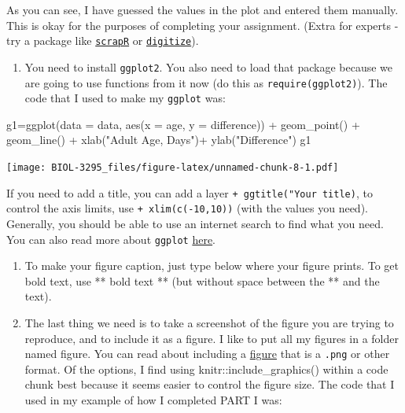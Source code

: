 \documentclass[
]{book}
\newenvironment{Shaded}{\begin{snugshade}}{\end{snugshade}}
\newcommand{\AttributeTok}[1]{\textcolor[rgb]{0.77,0.63,0.00}{#1}}
\newcommand{\FunctionTok}[1]{\textcolor[rgb]{0.00,0.00,0.00}{#1}}
\newcommand{\NormalTok}[1]{#1}
\newcommand{\OtherTok}[1]{\textcolor[rgb]{0.56,0.35,0.01}{#1}}
\newcommand{\SpecialCharTok}[1]{\textcolor[rgb]{0.00,0.00,0.00}{#1}}
\newcommand{\StringTok}[1]{\textcolor[rgb]{0.31,0.60,0.02}{#1}}
\providecommand{\tightlist}{%
  \setlength{\itemsep}{0pt}\setlength{\parskip}{0pt}}
\begin{document}
As you can see, I have guessed the values in the plot and entered them manually. This is okay for the purposes of completing your assignment. (Extra for experts - try a package like \href{https://github.com/adamkucharski/scrapR}{\texttt{scrapR}} or \href{https://github.com/tpoisot/digitize}{\texttt{digitize}}).

\begin{enumerate}
\def\labelenumi{\arabic{enumi}.}
\setcounter{enumi}{5}
\tightlist
\item
  You need to install \texttt{ggplot2}. You also need to load that package because we are going to use functions from it now (do this as \texttt{require(ggplot2)}). The code that I used to make my \texttt{ggplot} was:
\end{enumerate}

\begin{Shaded}
\begin{Highlighting}[]
\NormalTok{g1}\OtherTok{=}\FunctionTok{ggplot}\NormalTok{(}\AttributeTok{data =}\NormalTok{ data, }\FunctionTok{aes}\NormalTok{(}\AttributeTok{x =}\NormalTok{ age, }\AttributeTok{y =}\NormalTok{ difference)) }\SpecialCharTok{+} 
  \FunctionTok{geom\_point}\NormalTok{() }\SpecialCharTok{+}
  \FunctionTok{geom\_line}\NormalTok{() }\SpecialCharTok{+}
  \FunctionTok{xlab}\NormalTok{(}\StringTok{"Adult Age, Days"}\NormalTok{)}\SpecialCharTok{+}
  \FunctionTok{ylab}\NormalTok{(}\StringTok{"Difference"}\NormalTok{)}
\NormalTok{g1}
\end{Highlighting}
\end{Shaded}

\texttt{[image: BIOL-3295\_files/figure-latex/unnamed-chunk-8-1.pdf]}

If you need to add a title, you can add a layer \texttt{+\ ggtitle("Your\ title)}, to control the axis limits, use \texttt{+\ xlim(c(-10,10))} (with the values you need). Generally, you should be able to use an internet search to find what you need. You can also read more about \texttt{ggplot} \href{https://ahurford.github.io/quant-guide-all-courses/ggplot.html}{here}.

\begin{enumerate}
\def\labelenumi{\arabic{enumi}.}
\setcounter{enumi}{6}
\item
  To make your figure caption, just type below where your figure prints. To get bold text, use ** bold text ** (but without space between the ** and the text).
\item
  The last thing we need is to take a screenshot of the figure you are trying to reproduce, and to include it as a figure. I like to put all my figures in a folder named figure. You can read about including a \href{https://bookdown.org/yihui/rmarkdown/r-code.html\#figures}{figure} that is a \texttt{.png} or other format. Of the options, I find using knitr::include\_graphics() within a code chunk best because it seems easier to control the figure size. The code that I used in my example of how I completed PART I was:
\end{enumerate}
\end{document}
